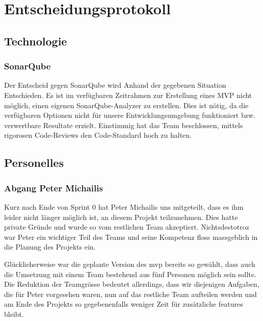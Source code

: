 \documentclass[../main.tex]{subfiles}
\begin{document}
    \section{Entscheidungsprotokoll}
    
    \subsection{Technologie}
    
    \subsubsection{SonarQube}
    \par Der Entscheid gegen SonarQube wird Anhand der gegebenen Situation Entschieden. Es ist im verfügbaren Zeitrahmen zur Erstellung eines MVP nicht möglich, einen eigenen SonarQube-Analyzer zu erstellen. Dies ist nötig, da die verfügbaren Optionen nicht für unsere Entwicklungsumgebung funktioniert bzw. verwertbare Resultate erzielt. Einstimmig hat das Team beschlossen, mittels rigorosen Code-Reviews den Code-Standard hoch zu halten.
    
    \subsection{Personelles}
    \subsubsection{Abgang Peter Michailis}
    \par Kurz nach Ende von Sprint 0 hat Peter Michailis uns mitgeteilt, dass es ihm leider nicht länger möglich ist, an diesem Projekt teilzunehmen. Dies hatte private Gründe und wurde so vom restlichen Team akzeptiert. Nichtsdestotroz war Peter ein wichtiger Teil des Teams und seine Kompetenz floss massgeblich in die Planung des Projekts ein. 
    \par Glücklicherweise war die geplante Version des \gls{mvp} bereits so gewählt, dass auch die Umsetzung mit einem Team bestehend aus fünf Personen möglich sein sollte. Die Reduktion der Teamgrösse bedeutet allerdings, dass wir diejenigen Aufgaben, die für Peter vorgesehen waren, nun auf das restliche Team aufteilen werden und am Ende des Projekts so gegebenenfalls weniger Zeit für zusätzliche \glspl{feature} bleibt.
\end{document}
